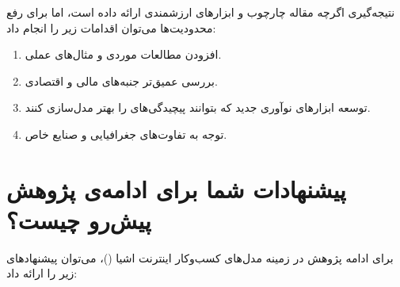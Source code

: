 \documentclass[10pt, twocolumn]{article}
\begin{document}
 نتیجه‌گیری  
اگرچه مقاله چارچوب و ابزارهای ارزشمندی ارائه داده است، اما برای رفع محدودیت‌ها می‌توان اقدامات زیر را انجام داد:  
\begin{enumerate}
\item 
افزودن مطالعات موردی و مثال‌های عملی.  
\item 
بررسی عمیق‌تر جنبه‌های مالی و اقتصادی.  
\item 
توسعه ابزارهای نوآوری جدید که بتوانند پیچیدگی‌های  را بهتر مدل‌سازی کنند.  
\item 
توجه به تفاوت‌های جغرافیایی و صنایع خاص.  
\end{enumerate}
\section{پیشنهادات شما برای ادامه‌ی پژوهش پیش‌رو چیست؟}
برای ادامه پژوهش در زمینه مدل‌های کسب‌وکار اینترنت اشیا ()، می‌توان پیشنهادهای زیر را ارائه داد:  
\end{document}
